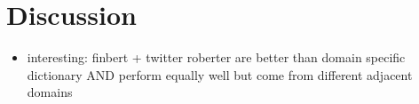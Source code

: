\section{Discussion}

\begin{itemize}[noitemsep]
	\item interesting: finbert + twitter roberter are better than domain specific dictionary AND perform equally well but come from different adjacent domains
\end{itemize}